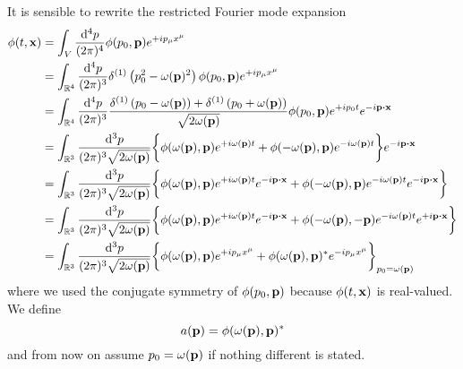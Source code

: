 It is sensible to rewrite the restricted Fourier mode expansion
\begin{equation*}
	\begin{split}
		\phi(t,\vb{x})
		&=
		\int_V\frac{\dd[4]{p}}{(2\pi)^4}
		\phi(p_0,\vb{p})
		e^{+ip_\mu x^\mu}
		\\
		&=
		\int_{\mathbb{R}^4}\frac{\dd[4]{p}}{(2\pi)^3}
		\delta^{(1)}\left(p_0^2-\omega(\vb{p})^2\right)
		\phi(p_0,\vb{p})
		e^{+ip_\mu x^\mu}
		\\
		&=
		\int_{\mathbb{R}^4}\frac{\dd[4]{p}}{(2\pi)^3}
		\frac{
			\delta^{(1)}\left(p_0-\omega(\vb{p})\right)
			+
			\delta^{(1)}\left(p_0+\omega(\vb{p})\right)
		}{\sqrt{2\omega(\vb{p})}}
		\phi(p_0,\vb{p})
		e^{+ip_0t}
		e^{-i\vb{p}\vdot\vb{x}}
		\\
		&=
		\int_{\mathbb{R}^3}\frac{\dd[3]{p}}{(2\pi)^3\sqrt{2\omega(\vb{p})}}
		\biggl\{
			\phi(\omega(\vb{p}),\vb{p})
			e^{+i\omega(\vb{p})t}
			+
			\phi(-\omega(\vb{p}),\vb{p})
			e^{-i\omega(\vb{p})t}
		\biggr\}
		e^{-i\vb{p}\vdot\vb{x}}
		\\
		&=
		\int_{\mathbb{R}^3}\frac{\dd[3]{p}}{(2\pi)^3\sqrt{2\omega(\vb{p})}}
		\biggl\{
			\phi(\omega(\vb{p}),\vb{p})
			e^{+i\omega(\vb{p})t}
			e^{-i\vb{p}\vdot\vb{x}}
			+
			\phi(-\omega(\vb{p}),\vb{p})
			e^{-i\omega(\vb{p})t}
			e^{-i\vb{p}\vdot\vb{x}}
		\biggr\}
		\\
		&=
		\int_{\mathbb{R}^3}\frac{\dd[3]{p}}{(2\pi)^3\sqrt{2\omega(\vb{p})}}
		\biggl\{
			\phi(\omega(\vb{p}),\vb{p})
			e^{+i\omega(\vb{p})t}
			e^{-i\vb{p}\vdot\vb{x}}
			+
			\phi(-\omega(\vb{p}),-\vb{p})
			e^{-i\omega(\vb{p})t}
			e^{+i\vb{p}\vdot\vb{x}}
		\biggr\}
		\\
		&=
		\int_{\mathbb{R}^3}\frac{\dd[3]{p}}{(2\pi)^3\sqrt{2\omega(\vb{p})}}
		\biggl\{
			\phi(\omega(\vb{p}),\vb{p})
			e^{+ip_\mu x^\mu}
			+
			\phi(\omega(\vb{p}),\vb{p})^*
			e^{-ip_\mu x^\mu}
		\biggr\}_{p_0=\omega(\vb{p})}
	\end{split}
\end{equation*}
where we used the conjugate symmetry of $\phi(p_0,\vb{p})$ because $\phi(t,\vb{x})$ is real-valued.
We define
\begin{equation}
	a(\vb{p})
	=
	\phi(\omega(\vb{p}),\vb{p})^*
\end{equation}
and from now on assume $p_0=\omega(\vb{p})$ if nothing different is stated.

